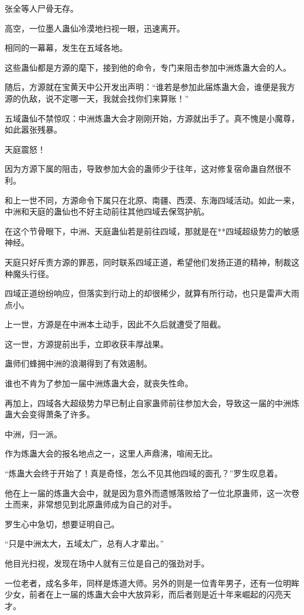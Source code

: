 \begin{this_body}
张全等人尸骨无存。

高空，一位墨人蛊仙冷漠地扫视一眼，迅速离开。

相同的一幕幕，发生在五域各地。

这些蛊仙都是方源的麾下，接到他的命令，专门来阻击参加中洲炼蛊大会的人。

随后，方源就在宝黄天中公开发出声明：“谁若是参加此届炼蛊大会，谁便是我方源的仇敌，说不定哪一天，我就会找你们来算账！”

五域蛊仙不禁惊叹：中洲炼蛊大会才刚刚开始，方源就出手了。真不愧是小魔尊，如此嚣张残暴。

天庭震怒！

因为方源下属的阻击，导致参加大会的蛊师少于往年，这对修复宿命蛊自然很不利。

和上一世不同，方源命令下属只在北原、南疆、西漠、东海四域活动。如此一来，中洲和天庭的蛊仙也不好主动前往其他四域去保驾护航。

在这个节骨眼下，中洲、天庭蛊仙若是前往四域，那就是在**四域超级势力的敏感神经。

天庭只好斥责方源的罪恶，同时联系四域正道，希望他们发扬正道的精神，制裁这种魔头行径。

四域正道纷纷响应，但落实到行动上的却很稀少，就算有所行动，也只是雷声大雨点小。

上一世，方源是在中洲本土动手，因此不久后就遭受了阻截。

这一世，方源提前出手，立即收获丰厚战果。

蛊师们蜂拥中洲的浪潮得到了有效遏制。

谁也不肯为了参加一届中洲炼蛊大会，就丧失性命。

再加上，四域各大超级势力早已制止自家蛊师前往参加大会，导致这一届的中洲炼蛊大会变得萧条了许多。

中洲，归一派。

作为炼蛊大会的报名地点之一，这里人声鼎沸，喧闹无比。

“炼蛊大会终于开始了！真是奇怪，怎么不见其他四域的面孔？”罗生叹息着。

他在上一届的炼蛊大会中，就是因为意外而遗憾落败给了一位北原蛊师，这一次卷土而来，非常想见到北原蛊师成为自己的对手。

罗生心中急切，想要证明自己。

“只是中洲太大，五域太广，总有人才辈出。”

他目光扫视，发现在场中人就有三位是自己的强劲对手。

一位老者，成名多年，同样是炼道大师。另外的则是一位青年男子，还有一位明眸少女，前者在上一届的炼蛊大会中大放异彩，而后者则是近十年来崛起的闪亮天才。


\end{this_body}
